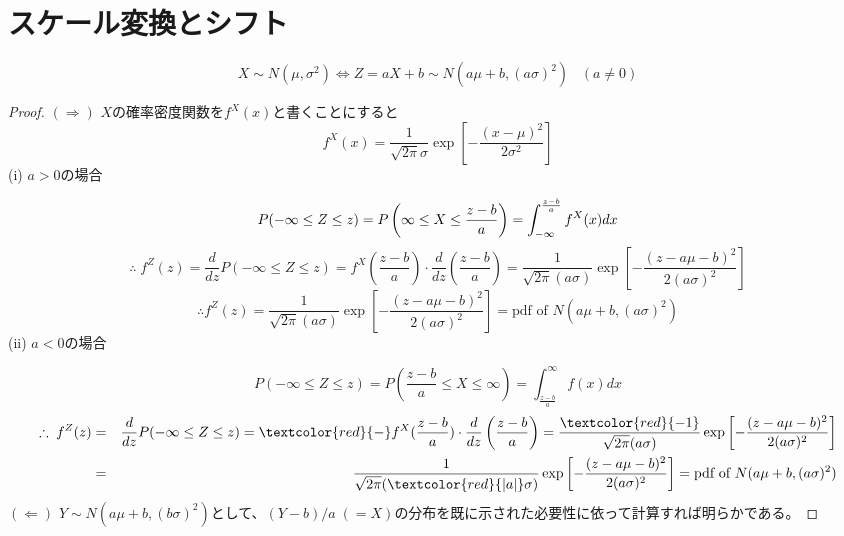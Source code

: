     \section{スケール変換とシフト}
        \begin{shadebox}
            \[X \sim N(\mu,\sigma^2) \Leftrightarrow Z=aX+b \sim N(a\mu+b,(a\sigma)^2) \hspace{10pt} (a \neq 0)\]
        \end{shadebox}
        \begin{proof}
            \quad\par
            $(\Rightarrow)$\newline
            $X$の確率密度関数を$f^X(x)$と書くことにすると
            \[f^X(x) = \frac{1}{\sqrt{2\pi}\sigma}\exp\left[-\frac{(x-\mu)^2}{2\sigma^2}\right]\]
            (i) $a>0$の場合\par
            \[P(-\infty \leq Z \leq z) = P\left(\-\infty \leq X \leq \frac{z-b}{a}\right) = \int_{-\infty}^{\frac{z-b}{a}}{f^X(x) dx}\]
            \[\therefore \; f^Z(z) = \frac{d}{dz}P(-\infty \leq Z \leq z) = f^X(\frac{z-b}{a})\cdot\frac{d}{dz}\left(\frac{z-b}{a}\right) = \frac{1}{\sqrt{2\pi}(a\sigma)}\exp\left[-\frac{(z-a\mu-b)^2}{2(a\sigma)^2}\right]\]
            \[\therefore f^Z(z) = \frac{1}{\sqrt{2\pi}(a\sigma)}\exp\left[-\frac{(z-a\mu-b)^2}{2(a\sigma)^2}\right] = \text{pdf of  }N(a\mu+b,(a\sigma)^2)\]
            (ii) $a<0$の場合\par
            \[P(-\infty \leq Z \leq z) = P\left(\frac{z-b}{a} \leq X \leq \infty\right) = \int_{\frac{z-b}{a}}^{\infty}{f(x) dx}\]
            \begin{align*}
                \therefore \; f^Z(z) &=& \frac{d}{dz}P(-\infty \leq Z \leq z) = \textcolor{red}{-}f^X(\frac{z-b}{a})\cdot\frac{d}{dz}\left(\frac{z-b}{a}\right) = \frac{\textcolor{red}{-1}}{\sqrt{2\pi}(a\sigma)}\exp\left[-\frac{(z-a\mu-b)^2}{2(a\sigma)^2}\right]\\
                &=& \frac{1}{\sqrt{2\pi}(\textcolor{red}{|a|}\sigma)}\exp\left[-\frac{(z-a\mu-b)^2}{2(a\sigma)^2}\right] = \text{pdf of  }N(a\mu+b,(a\sigma)^2)
            \end{align*}
            \newline
            $(\Leftarrow)$\newline
            $Y \sim N(a\mu+b,(b\sigma)^2)$として、$(Y-b)/a\;(=X)$の分布を既に示された必要性に依って計算すれば明らかである。
        \end{proof}
